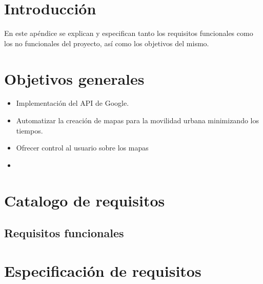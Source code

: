 
\section{Introducción}
En este apéndice se explican y especifican tanto los requisitos funcionales como los no funcionales del proyecto, así como los objetivos del mismo.

\section{Objetivos generales}

\begin{itemize}
    \item Implementación del API de Google.
    \item Automatizar la creación de mapas para la movilidad urbana minimizando los tiempos.
    \item Ofrecer control al usuario sobre los mapas
    \item 
\end{itemize}

\section{Catalogo de requisitos}

\subsection{Requisitos funcionales}

\section{Especificación de requisitos}


